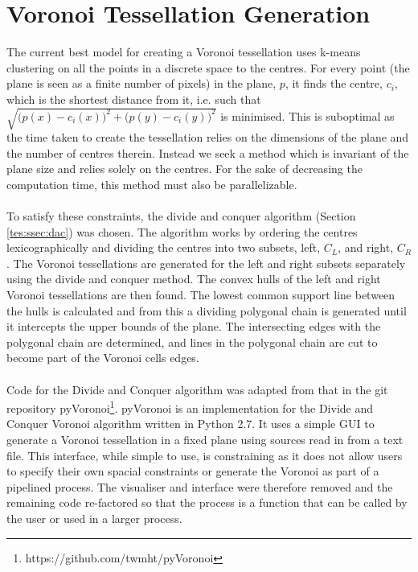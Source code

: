 \section{Voronoi Tessellation Generation}\label{des:sec:vor}
The current best model for creating a Voronoi tessellation uses k-means clustering on all the points in a discrete space to the centres. For every point (the plane is seen as a finite number of pixels) in the plane, $p$, it finds the centre, $c_i$, which is the shortest distance from it, i.e. such that $\sqrt{\big(p(x)-c_i(x)\big)^2 + \big(p(y)-c_i(y)\big)^2}$ is minimised. This is suboptimal as the time taken to create the tessellation relies on the dimensions of the plane and the number of centres therein. Instead we seek a method which is invariant of the plane size and relies solely on the centres. For the sake of decreasing the computation time, this method must also be parallelizable. 
\\
\\
To satisfy these constraints, the divide and conquer algorithm (Section \ref{tes:ssec:dac}) was chosen. The algorithm works by ordering the centres lexicographically and dividing the centres into two subsets, left, $C_L$, and right, $C_R$. The Voronoi tessellations are generated for the left and right subsets separately using the divide and conquer method. The convex hulls of the left and right Voronoi tessellations are then found. The lowest common support line between the hulls is calculated and from this a dividing polygonal chain is generated until it intercepts the upper bounds of the plane. The intersecting edges with the polygonal chain are determined, and lines in the polygonal chain are cut to become part of the Voronoi cells edges.
\\
\\
Code for the Divide and Conquer algorithm was adapted from that in the git repository pyVoronoi\footnote{https://github.com/twmht/pyVoronoi}. pyVoronoi is an implementation for the Divide and Conquer Voronoi algorithm written in Python 2.7. It uses a simple GUI to generate a Voronoi tessellation in a fixed plane using sources read in from a text file. This interface, while simple to use, is constraining as it does not allow users to specify their own spacial constraints or generate the Voronoi as part of a pipelined process. The visualiser and interface were therefore removed and the remaining code re-factored so that the process is a function that can be called by the user or used in a larger process.

